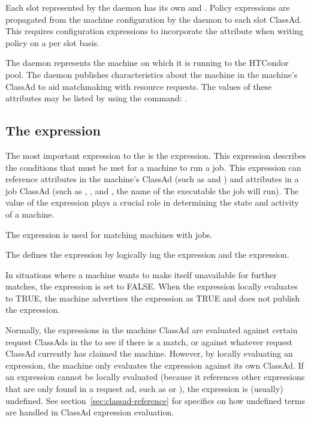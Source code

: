 Each slot represented by the  daemon 
has its own  and .
Policy expressions are propagated from the machine configuration
by the  daemon to each slot ClassAd.
This requires configuration expressions to incorporate the 
attribute when writing policy on a per slot basis.

The  daemon represents the machine on which it is running to
the HTCondor pool.  
The daemon publishes characteristics about the
machine in the machine's ClassAd to aid matchmaking with resource requests.
The values of these attributes may be listed by using the command:
.

\subsection{\label{sec:Start-Expr}
The  expression}

The most important expression to the 
is the  expression.  
This expression describes the conditions that must be met for a
machine to run a job. 
This expression can reference attributes
in the machine's ClassAd (such as  and )
and attributes in a job ClassAd (such as
, , and , the name of the
executable the job will run).
The value of the  expression plays a crucial role in
determining the state and activity of a machine.

The  expression is used for
matching machines with jobs.

The  defines the
 expression by logically ing the 
 expression and the 
expression. 

In situations where a machine wants to make itself
unavailable for further matches, the 
expression is set to FALSE.  
When the  expression locally evaluates to TRUE, the
machine advertises the  expression as TRUE and
does not publish the  expression.

Normally, the expressions in the machine ClassAd are evaluated against
certain request ClassAds in the  to see if there is
a match, or against whatever request ClassAd currently has claimed the
machine.  However, by locally evaluating an expression, the machine only
evaluates the expression against its own ClassAd.  If an expression
cannot be locally evaluated (because it references other expressions
that are only found in a request ad, such as  or
), the expression is (usually) undefined.
See section~\ref{sec:classad-reference} for specifics on
how undefined terms are handled in ClassAd expression evaluation. 

